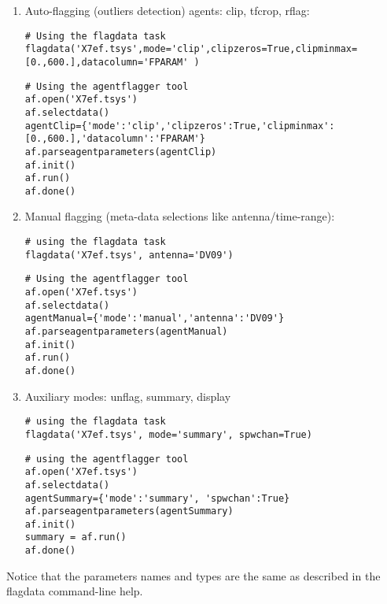 \begin{enumerate}

\item Auto-flagging (outliers detection) agents: clip, tfcrop, rflag:

\begin{verbatim}
# Using the flagdata task
flagdata('X7ef.tsys',mode='clip',clipzeros=True,clipminmax=[0.,600.],datacolumn='FPARAM' )
\end{verbatim}
 
\begin{verbatim}
# Using the agentflagger tool
af.open('X7ef.tsys')
af.selectdata()
agentClip={'mode':'clip','clipzeros':True,'clipminmax':[0.,600.],'datacolumn':'FPARAM'}
af.parseagentparameters(agentClip)
af.init()
af.run()
af.done()

\end{verbatim}

\item Manual flagging (meta-data selections like antenna/time-range):

\begin{verbatim}
# using the flagdata task
flagdata('X7ef.tsys', antenna='DV09')
\end{verbatim}

\begin{verbatim}
# Using the agentflagger tool
af.open('X7ef.tsys')
af.selectdata()
agentManual={'mode':'manual','antenna':'DV09'}
af.parseagentparameters(agentManual)
af.init()
af.run()
af.done() 

\end{verbatim}

\item Auxiliary modes: unflag, summary, display

\begin{verbatim}
# using the flagdata task
flagdata('X7ef.tsys', mode='summary', spwchan=True)

\end{verbatim}

\begin{verbatim}
# using the agentflagger tool
af.open('X7ef.tsys')
af.selectdata()
agentSummary={'mode':'summary', 'spwchan':True}
af.parseagentparameters(agentSummary)
af.init()
summary = af.run()
af.done()

\end{verbatim}

\end{enumerate}

Notice that the parameters names and types are the same as described in the
flagdata command-line help.

